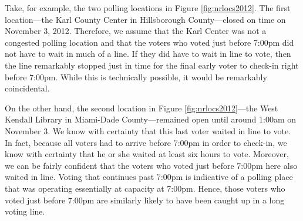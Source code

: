 \documentclass[12pt,titlepage]{article}
\begin{document}
Take, for example, the two polling locations in Figure
\ref{fig:nrlocs2012}.  The first location---the Karl County Center in
Hillsborough County---closed on time on November 3, 2012.  Therefore,
we assume that the Karl Center was not a congested polling location
and that the voters who voted just before 7:00pm did not have to wait
in much of a line.  If they did have to wait in line to vote, then the
line remarkably stopped just in time for the final early voter to
check-in right before 7:00pm.  While this is technically possible, it
would be remarkably coincidental.

On the other hand, the second location in Figure
\ref{fig:nrlocs2012}---the West Kendall Library in Miami-Dade
County---remained open until around 1:00am on November 3.  We know
with certainty that this last voter waited in line to vote.  In fact,
because all voters had to arrive before 7:00pm in order to check-in,
we know with certainty that he or she waited at least six hours to
vote.  Moreover, we can be fairly confident that the voters who voted
just before 7:00pm here also waited in line.  Voting that continues
past 7:00pm is indicative of a polling place that was operating
essentially at capacity at 7:00pm.  Hence, those voters who voted just
before 7:00pm are similarly likely to have been caught up in a long
voting line.

 
\end{document}
